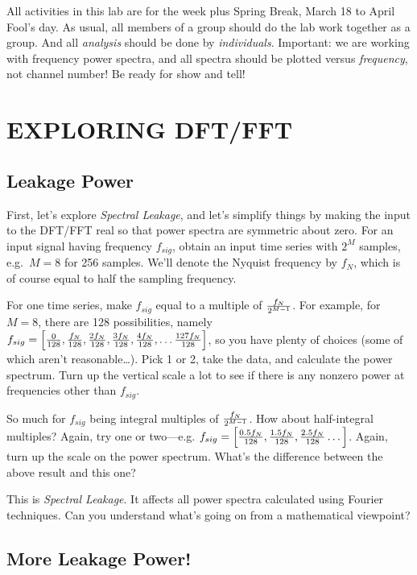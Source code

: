 \documentclass[11pt,preprint]{aastex}
\begin{document}
All activities in this lab are for the week plus Spring Break, March 18 to
April Fool's day. As usual, all members of a group should do the lab work
together as a group. And all {\it analysis} should be done by {\it
  individuals}.  Important: we are working with frequency power spectra,
and all spectra should be plotted versus {\it frequency}, not channel
number! Be ready for show and tell!

\section{EXPLORING DFT/FFT}

\subsection{Leakage Power}

First, let's explore {\it Spectral Leakage}, and let's simplify things by
making the input to the DFT/FFT real so that power spectra are symmetric
about zero.  For an input signal having frequency $f_{sig}$, obtain an
input time series with $2^M$ samples, e.g.\ $M=8$ for 256 samples.  We'll
denote the Nyquist frequency by $f_N$, which is of course equal to half the
sampling frequency.

For one time series, make $f_{sig}$ equal to a multiple of $f_N \over
{2^{M-1}}$. For example, for $M=8$, there are 128 possibilities, namely
$f_{sig} = \left[ {0 \over 128},{f_N \over 128},{2 f_N \over 128},{3 f_N
    \over 128},{4 f_N \over 128}, \dots {127 f_N \over 128}\right]$, so you
have plenty of choices (some of which aren't reasonable\dots). Pick 1 or 2,
take the data, and calculate the power spectrum. Turn up the vertical scale
a lot to see if there is any nonzero power at frequencies other than
$f_{sig}$.

So much for $f_{sig}$ being integral multiples of $f_N \over
2^{M-1}$. How about half-integral multiples? Again, try one or
two---e.g. $f_{sig} = \left[ {0.5 f_N \over 128},{1.5 f_N \over
128},{2.5 f_N \over 128}\dots \right]$.  Again, turn up the scale on the
power spectrum. What's the difference between the above result and this
one?

This is {\it Spectral Leakage}. It affects all power spectra calculated
using Fourier techniques. Can you understand what's going on from a
mathematical viewpoint?

\subsection{More Leakage Power!} \label{leakage}
\end{document}
